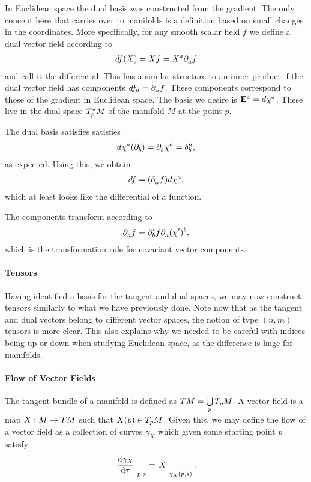 In Euclidean space the dual basis was constructed from the gradient. The only concept here that carries over to manifolds is a definition based on small changes in the coordinates. More specifically, for any smooth scalar field $f$ we define a dual vector field according to
\begin{align*}
	df(X) = Xf = X^{a}\del{a}{f}
\end{align*}
and call it the differential. This has a similar structure to an inner product if the dual vector field has components $df_{a} = \del{a}{f}$. These components correspond to those of the gradient in Euclidean space. The basis we desire is $\db{a} = d\chi^{a}$. These live in the dual space $\ds{p}{M}$ of the manifold $M$ at the point $p$.

The dual basis satisfies satisfies
\begin{align*}
	d\chi^{a}(\del{b}{}) = \del{b}{\chi^{a}} = \kdelta{b}{a},
\end{align*}
as expected. Using this, we obtain
\begin{align*}
	df = (\del{a}{f})d\chi^{a},
\end{align*}
which at least looks like the differential of a function.

The components transform according to
\begin{align*}
	\del{a}{f} = \del[\prime]{b}{f}\del{a}{(\chi^{\prime})^{b}},
\end{align*}
which is the transformation rule for covariant vector components.

\paragraph{Tensors}
Having identified a basis for the tangent and dual spaces, we may now construct tensors similarly to what we have previously done. Note now that as the tangent and dual vectors belong to different vector spaces, the notion of type $(n, m)$ tensors is more clear. This also explains why we needed to be careful with indices being up or down when studying Euclidean space, as the difference is huge for manifolds.

\paragraph{Flow of Vector Fields}
The tangent bundle of a manifold is defined as $TM = \bigcup\limits_{p}\ts{p}{M}$. A vector field is a map $X: M\to\tbun{M}$ such that $X(p)\in\ts{p}{M}$. Given this, we may define the flow of a vector field as a collection of curves $\gamma_{X}$ which given some starting point $p$ satisfy
\begin{align*}
	\deval{\gamma_{X}}{\tau}{p, s} = \eval{X}_{\gamma_{X}(p, s)}.
\end{align*}

